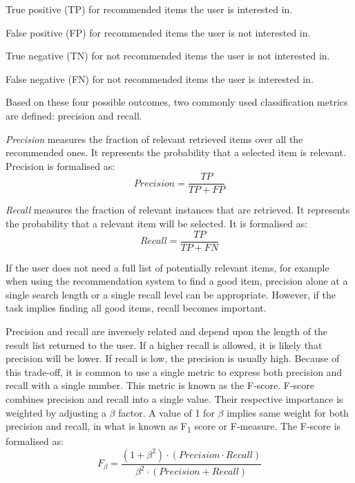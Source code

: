 \begin{description}
		\begin{description}
			\item True positive (TP) for recommended items the user is interested in.
			\item False positive (FP) for recommended items the user is not interested in.
			\item True negative (TN) for not recommended items the user is not interested in.
			\item False negative (FN) for not recommended items the user is  interested in.
		\end{description}

		Based on these four possible outcomes, two commonly used classification metrics are defined: precision and recall.

		\begin{description}
			\item \emph{Precision} measures the fraction of relevant retrieved items over all the recommended ones. It represents the probability that a selected item is relevant. Precision is formalised as:
			\begin{equation}\label{precision} 
			Precision = \frac{TP}{TP + FP}
			\end{equation}


			\item \emph{Recall} measures the fraction of relevant instances that are retrieved. It represents the probability that a relevant item will be selected. It is formalised as:
			\begin{equation}\label{recall} 
			Recall = \frac{TP}{TP + FN}
			\end{equation}
		\end{description}

If the user does not need a full list of potentially relevant items, for example when using the recommendation system to find a good item, precision alone at a single search length or a single recall level can be appropriate. However, if the task implies finding all good items, recall becomes important. 

Precision and recall are inversely related and depend upon the length of the result list returned to the user. If a higher recall is allowed, it is likely that precision will be lower. If recall is low, the precision is usually high. Because of this trade-off, it is common to use a single metric to express both precision and recall with a single number. This metric is known as the F-score.
F-score combines precision and recall into a single value. Their respective importance is weighted by adjusting a $\beta$ factor. A value of 1 for $\beta$ implies same weight for both precision and recall, in what is known as F\textsubscript{1} score or F-measure. The F-score is formalised as:
		\begin{equation}\label{fscore} 
		F_\beta = \frac{(1 + \beta^2) \cdot (Precision \cdot Recall)}
					{\beta^2 \cdot (Precision + Recall)}
		\end{equation}


\end{description}
